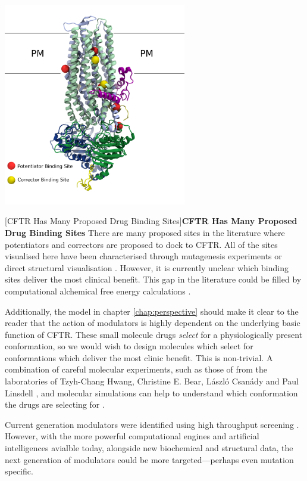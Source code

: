 \begin{center}
	\includegraphics[width=0.6\textwidth]{figures/many_drug_sites.pdf}
\end{center}
\begingroup
\captionsetup{singlelinecheck = false, justification=raggedright}
[CFTR Has Many Proposed Drug Binding Sites]{\textbf{CFTR Has Many Proposed Drug Binding Sites} {There are many proposed sites in the literature where potentiators and correctors are proposed to dock to CFTR. All of the sites visualised here have been characterised through mutagenesis experiments or direct structural visualisation \cite{yeh2019, laselva2021a, liu2019, baatallah2021}. However, it is currently unclear which binding sites deliver the most clinical benefit. This gap in the literature could be filled by computational alchemical free energy calculations \cite{jorgensen2008,chipot2007}. }}
\label{many_drug_bound_CFTR}
\endgroup


Additionally, the model in chapter \ref{chap:perspective} should make it clear to the reader that the action of modulators is highly dependent on the underlying basic function of CFTR. These small molecule drugs \textit{select} for a physiologically present conformation, so we would wish to design molecules which select for conformations which deliver the most clinic benefit. This is non-trivial. A combination of careful molecular experiments, such as those of from the laboratories of Tzyh-Chang Hwang,  Christine E. Bear, L\'aszl\'o Csan\'ady and Paul Linsdell \cite{linsdell2018, csanady2019, laselva2022, zhang2017b}, and molecular simulations can help to understand which conformation the drugs are selecting for \cite{laselva2021a}.

Current generation modulators were identified using high throughput screening \cite{vangoor2009}. However, with the more powerful computational engines and artificial intelligences avialble today, alongside new biochemical and structural data, the next generation of modulators could be more targeted---perhaps even mutation specific.

